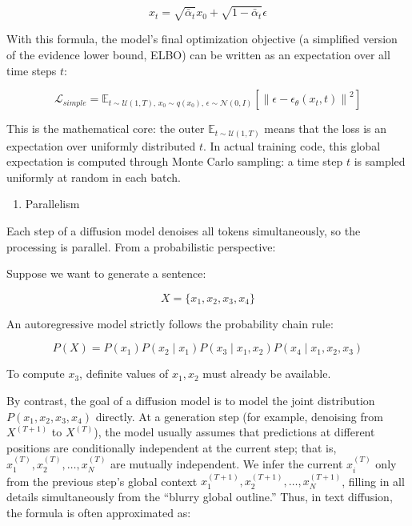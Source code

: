 \[
x_t=\sqrt{\bar{\alpha}_t}x_0+\sqrt{1-\bar{\alpha}_t}\epsilon
\]

With this formula, the model's final optimization objective (a simplified version of the evidence lower bound, ELBO) can be written as an expectation over all time steps \(t\):

\[
\mathcal{L}_{simple}
=\mathbb{E}_{t\sim\mathcal{U}(1,T),\,x_0\sim q(x_0),\,\epsilon\sim\mathcal{N}(0,I)}
\left[\left\|\epsilon-\epsilon_\theta(x_t,t)\right\|^2\right]
\]

This is the mathematical core: the outer \(\mathbb{E}_{t\sim\mathcal{U}(1,T)}\) means that the loss is an expectation over uniformly distributed \(t\). In actual training code, this global expectation is computed through Monte Carlo sampling: a time step \(t\) is sampled uniformly at random in each batch.

\begin{enumerate}
\def\labelenumi{\arabic{enumi}.}
\setcounter{enumi}{1}
\tightlist
\item
  Parallelism
\end{enumerate}

Each step of a diffusion model denoises all tokens simultaneously, so the processing is parallel. From a probabilistic perspective:

Suppose we want to generate a sentence:

\[
X = \{x_1, x_2, x_3, x_4\}
\]

An autoregressive model strictly follows the probability chain rule:

\[
P(X) = P(x_1)P(x_2 \mid x_1)P(x_3 \mid x_1, x_2)P(x_4 \mid x_1, x_2, x_3)
\]

To compute \(x_3\), definite values of \(x_1,x_2\) must already be available.

By contrast, the goal of a diffusion model is to model the joint distribution \(P(x_1,x_2,x_3,x_4)\) directly. At a generation step (for example, denoising from \(X^{(T+1)}\) to \(X^{(T)}\)), the model usually assumes that predictions at different positions are conditionally independent at the current step; that is, \(x_1^{(T)},x_2^{(T)},\ldots,x_N^{(T)}\) are mutually independent. We infer the current \(x_i^{(T)}\) only from the previous step's global context \(x_1^{(T+1)},x_2^{(T+1)},\ldots,x_N^{(T+1)}\), filling in all details simultaneously from the ``blurry global outline.'' Thus, in text diffusion, the formula is often approximated as:

